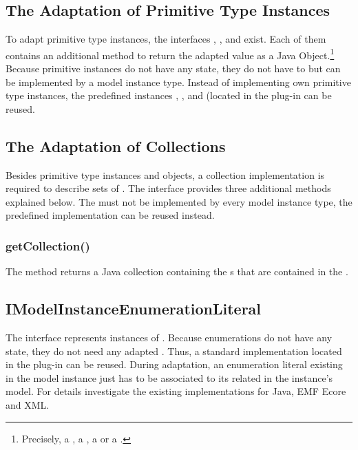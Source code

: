 \subsection{The Adaptation of Primitive Type Instances}

To adapt primitive type instances, the interfaces , 
,  and 
 exist. Each of them contains an additional method 
to return the adapted value as a Java Object.\footnote{Precisely, a 
, a , a  or a .} Because 
primitive instances do not have any state, they do not have to but can be
implemented by a model instance type. Instead of implementing own primitive 
type instances, the predefined instances , 
,  and 
 (located in the plug-in 
 can be reused.


\subsection{The Adaptation of Collections}

Besides primitive type instances and objects, a collection implementation is 
required to describe sets of . The interface 
 provides three
additional methods explained below. The  
must not be implemented by every model instance type, the predefined
implementation  can be reused instead.

\subsubsection{getCollection()}

The method  returns a Java collection containing the 
s that are contained in the
.


\subsection{IModelInstanceEnumerationLiteral}

The interface  represents instances of 
. Because enumerations do not have any state, they do not
need any adapted . Thus, a standard 
 implementation located in the plug-in
 can be reused. During 
adaptation, an enumeration literal existing in the model instance just has to 
be associated to its related  in the instance's model. 
For details investigate the existing  implementations for 
Java, \acs{EMF} Ecore and \acs{XML}.


